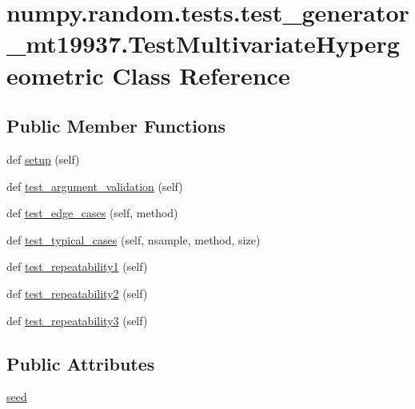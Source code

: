 \hypertarget{classnumpy_1_1random_1_1tests_1_1test__generator__mt19937_1_1TestMultivariateHypergeometric}{}\section{numpy.\+random.\+tests.\+test\+\_\+generator\+\_\+mt19937.\+Test\+Multivariate\+Hypergeometric Class Reference}
\label{classnumpy_1_1random_1_1tests_1_1test__generator__mt19937_1_1TestMultivariateHypergeometric}
\subsection*{Public Member Functions}
\begin{DoxyCompactItemize}
\item 
def \hyperlink{classnumpy_1_1random_1_1tests_1_1test__generator__mt19937_1_1TestMultivariateHypergeometric_ab242d7d51d41ec9e44df4910e52f608c}{setup} (self)
\item 
def \hyperlink{classnumpy_1_1random_1_1tests_1_1test__generator__mt19937_1_1TestMultivariateHypergeometric_ac89bcbe5ea5b2acaa5c4166dbf2a109c}{test\+\_\+argument\+\_\+validation} (self)
\item 
def \hyperlink{classnumpy_1_1random_1_1tests_1_1test__generator__mt19937_1_1TestMultivariateHypergeometric_a0fa1cf18090110f03b9420a61d0deac2}{test\+\_\+edge\+\_\+cases} (self, method)
\item 
def \hyperlink{classnumpy_1_1random_1_1tests_1_1test__generator__mt19937_1_1TestMultivariateHypergeometric_ad2acedd7e03693329a0813e417753d81}{test\+\_\+typical\+\_\+cases} (self, nsample, method, size)
\item 
def \hyperlink{classnumpy_1_1random_1_1tests_1_1test__generator__mt19937_1_1TestMultivariateHypergeometric_a00179ef46b724346c149b2ba070bc336}{test\+\_\+repeatability1} (self)
\item 
def \hyperlink{classnumpy_1_1random_1_1tests_1_1test__generator__mt19937_1_1TestMultivariateHypergeometric_aab41baa3ef52a77a37fb05b3dc9c5e1a}{test\+\_\+repeatability2} (self)
\item 
def \hyperlink{classnumpy_1_1random_1_1tests_1_1test__generator__mt19937_1_1TestMultivariateHypergeometric_a3200547b7013d441819072f221b2e285}{test\+\_\+repeatability3} (self)
\end{DoxyCompactItemize}
\subsection*{Public Attributes}
\begin{DoxyCompactItemize}
\item 
\hyperlink{classnumpy_1_1random_1_1tests_1_1test__generator__mt19937_1_1TestMultivariateHypergeometric_a15c7f40c5ef6ff4e36d0e13c963d1bf1}{seed}
\end{DoxyCompactItemize}


